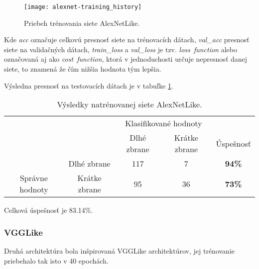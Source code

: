 \begin{figure}[H]
	\centering
	\texttt{[image: alexnet-training\_history]}
	\caption{Priebeh trénovania siete AlexNetLike.}
	\label{pic:alexnetlikehistory}
\end{figure}
Kde \textit{acc} označuje celkovú presnosť siete na trénovacích dátach, \textit{val\_acc} presnosť siete na validačných dátach, \textit{train\_loss} a
    \textit{val\_loss} je tzv. \textit{loss\ function} alebo označovaná aj ako \textit{cost\ function}, ktorá v jednoduchosti určuje nepresnosť danej siete,
    to znamená že čím nižšia hodnota tým lepšia.

Výsledna presnosť na testovacích dátach je v tabuľke \ref{tab:alexnetresults}.

\begin{table}[H]
    \centering
    \begin{tabular}{ccccc}
                                                                &                                    & \multicolumn{2}{c}{Klasifikované hodnoty}                                                         &                                    \\ \cline{3-5} 
                                                                & \multicolumn{1}{c|}{}              & \multicolumn{1}{c|}{Dlhé zbrane}                & \multicolumn{1}{c|}{Krátke zbrane}              & \multicolumn{1}{c|}{Úspešnosť}     \\ \cline{2-5} 
        \multicolumn{1}{c|}{}                                  & \multicolumn{1}{c|}{Dlhé zbrane}   & \multicolumn{1}{c|}{{\color[HTML]{009901} 117}} & \multicolumn{1}{c|}{{\color[HTML]{9A0000} 7}}  & \multicolumn{1}{c|}{\textbf{94\%}} \\ \cline{2-5} 
        \multicolumn{1}{c|}{\multirow{-2}{*}{Správne hodnoty}} & \multicolumn{1}{c|}{Krátke zbrane} & \multicolumn{1}{c|}{{\color[HTML]{9A0000} 95}}  & \multicolumn{1}{c|}{{\color[HTML]{009901} 36}} & \multicolumn{1}{c|}{\textbf{73\%}} \\ \cline{2-5} 
    \end{tabular}
    \caption{Výsledky natrénovanej siete AlexNetLike.}
    \label{tab:alexnetresults}
\end{table}
Celková úspešnosť je 83.14\%.

\subsubsection{VGGLike}
Druhá architektúra bola inšpirovaná VGGLike architektúrov, jej trénovanie priebehalo tak isto v 40 epochách.

